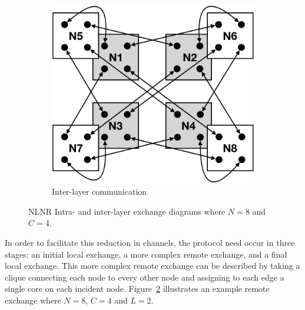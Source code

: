 \documentclass[10]{report}
\begin{document}
\begin{figure}
\begin{center}
\begin{subfigure}{0.49\linewidth}
			\centerline{\includegraphics[width=1.0\columnwidth]{inter_layer_nlnr}}
			\caption{Inter-layer communication \label{fig:inter_exchange}}
		\end{subfigure}
		\caption{NLNR Intra- and inter-layer exchange diagrams where $N = 8$ and $C = 4$. \label{fig:nlnr}}
	\end{center}
\end{figure}


In order to facilitate this reduction in channels, the protocol need occur in three stages: an initial local exchange, a more complex remote exchange, and a final local exchange.
This more complex remote exchange can be described by taking a clique connecting each node to every other node and assigning to each edge a single core on each incident node.
Figure~\ref{fig:nlnr} illustrates an example remote exchange where $N=8$, $C=4$ and $L=2$.
\end{document}

